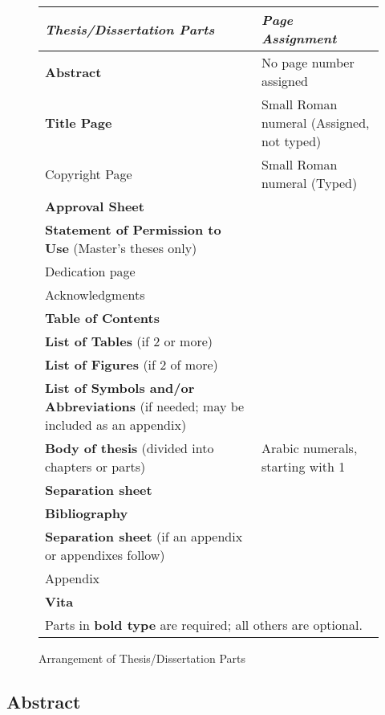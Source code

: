 \begin{figure}[tbp]
  \begin{tabular}{p{3.0in}p{2.0in}}
    \textit{Thesis/Dissertation Parts} & \textit{Page Assignment} \\ \toprule
    \textbf{Abstract} & No page number assigned \\ \midrule
    \textbf{Title Page} & Small Roman numeral (Assigned, not typed) \\ \midrule
    Copyright Page & Small Roman numeral (Typed) \\
    \textbf{Approval Sheet} & \\
    \textbf{Statement of Permission to Use} (Master's theses only) & \\
    Dedication page & \\
    Acknowledgments & \\
    \textbf{Table of Contents} & \\
    \textbf{List of Tables} (if 2 or more) & \\
    \textbf{List of Figures} (if 2 of more) & \\
    \textbf{List of Symbols and/or Abbreviations} (if needed; may be included as an appendix) & \\ \midrule
    \textbf{Body of thesis} (divided into chapters or parts) & Arabic numerals, starting with 1 \\
    \textbf{Separation sheet} & \\
    \textbf{Bibliography} & \\
    \textbf{Separation sheet} (if an appendix or appendixes follow) & \\
    Appendix & \\
    \textbf{Vita} & \\ \bottomrule
    \multicolumn{2}{p{5.0in}}{Parts in \textbf{bold type} are required; all others are optional.} \\
  \end{tabular}
  \caption{Arrangement of Thesis/Dissertation Parts}
  \label{fig:ArrangementOfThesisParts}
\end{figure}
\subsection{Abstract}
\label{sec:Abstract}

